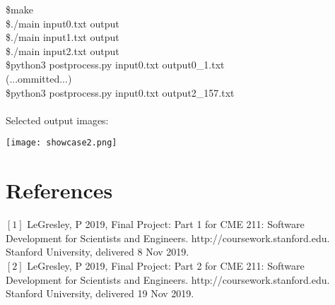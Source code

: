 \documentclass{article}
\begin{document}
{\selectfont \$make}\\
{\selectfont \$./main input0.txt output}\\
{\selectfont \$./main input1.txt output}\\
{\selectfont \$./main input2.txt output}\\
{\selectfont \$python3 postprocess.py input0.txt output0\_1.txt}\\
(...ommitted...)\\
{\selectfont \$python3 postprocess.py input0.txt output2\_157.txt}\\
\\
Selected output images:
\begin{center}

\texttt{[image: showcase2.png]}

\end{center}

\section{References}
$[1]$ LeGresley, P 2019, Final Project: Part 1 for CME 211: Software Development for Scientists and Engineers. http://coursework.stanford.edu. Stanford University, delivered 8 Nov 2019.\\
$[2]$ LeGresley, P 2019, Final Project: Part 2 for CME 211: Software Development for Scientists and Engineers. http://coursework.stanford.edu. Stanford University, delivered 19 Nov 2019.
\end{document}
